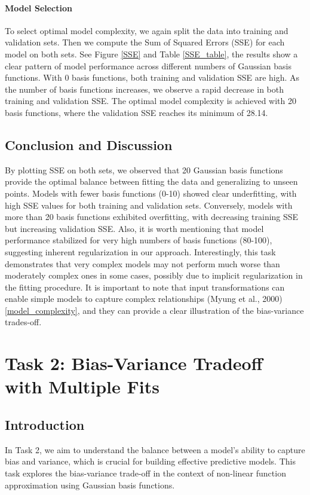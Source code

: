 \documentclass{article}
\begin{document}
\paragraph{Model Selection}
To select optimal model complexity, we again split the data into training and validation sets. Then we compute the Sum of Squared Errors (SSE) for each model on both sets. See Figure \ref{SSE} and Table \ref{SSE_table}, the results show a clear pattern of model performance across different numbers of Gaussian basis functions. With 0 basis functions, both training and validation SSE are high. As the number of basis functions increases, we observe a rapid decrease in both training and validation SSE. The optimal model complexity is achieved with 20 basis functions, where the validation SSE reaches its minimum of 28.14.


\subsection{Conclusion and Discussion}
By plotting SSE on both sets, we observed that 20 Gaussian basis functions provide the optimal balance between fitting the data and generalizing to unseen points. Models with fewer basis functions (0-10) showed clear underfitting, with high SSE values for both training and validation sets. Conversely, models with more than 20 basis functions exhibited overfitting, with decreasing training SSE but increasing validation SSE. Also, it is worth mentioning that model performance stabilized for very high numbers of basis functions (80-100), suggesting inherent regularization in our approach. Interestingly, this task demonstrates that very complex models may not perform much worse than moderately complex ones in some cases, possibly due to implicit regularization in the fitting procedure. It is important to note that input transformations can enable simple models to capture complex relationships (Myung et al., 2000)\ref{model_complexity}, and they can provide a clear illustration of the bias-variance trades-off.


\section{Task 2: Bias-Variance Tradeoff with Multiple Fits}

\subsection{Introduction}
In Task 2, we aim to understand the balance between a model's ability to capture bias and variance, which is crucial for building effective predictive models. This task explores the bias-variance trade-off in the context of non-linear function approximation using Gaussian basis functions.
\end{document}
